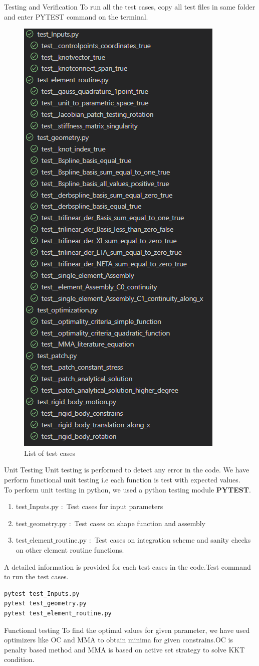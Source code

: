 \documentclass[a4paper,12pt,times]{article}
\begin{document}
\begin{section}{Testing and Verification}
To run all the test cases, copy all test files in same folder and enter PYTEST command on the terminal.\\ 
\begin{figure}[H]
\centering
\includegraphics[width=0.25\linewidth]{list_of_tests.png}
\caption{List of test cases }
\label{fig:List of test cases}
\end{figure}
\begin{subsection}{Unit Testing}
Unit testing is performed to detect any error in the code. We have perform functional unit testing i.e each function is test with expected values.\\
To perform unit testing in python, we used a python testing module \textbf{PYTEST}.
\begin{enumerate}
\item test$\_$Inputs.py $\colon$ Test cases for input parameters

\item test$\_$geometry.py $\colon$ Test cases on  shape function and assembly 

\item test$\_$element$\_$routine.py $\colon$ Test cases on integration scheme and sanity checks on other element routine functions.
\end{enumerate} 
A detailed information is provided for each test cases in the code.Test command to run the test cases.
\begin{lstlisting}
pytest test_Inputs.py
pytest test_geometry.py
pytest test_element_routine.py
\end{lstlisting}
\end{subsection}


\begin{subsection}{Functional testing}
To find the optimal values for given parameter, we have used optimizers like OC and MMA to obtain minima for given constrains.OC is penalty based method and MMA is based on active set strategy to solve KKT condition.

\end{subsection}
\end{section}
\end{document}
